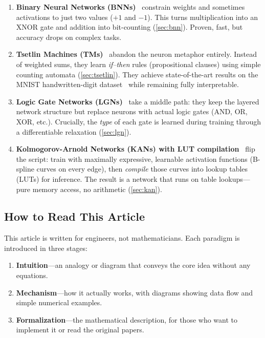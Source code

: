 \begin{enumerate}[leftmargin=2em]
  \item \textbf{Binary Neural Networks (BNNs)}~\cite{courbariaux2016bnn} constrain weights and
    sometimes activations to just two values ($+1$ and $-1$). This turns
    multiplication into an XNOR gate and addition into bit-counting
    (\cref{sec:bnn}).
    Proven, fast, but accuracy drops on complex tasks.

  \item \textbf{Tsetlin Machines (TMs)}~\cite{granmo2018tsetlin} abandon the neuron metaphor
    entirely. Instead of weighted sums, they learn \emph{if--then} rules
    (propositional clauses) using simple counting automata
    (\cref{sec:tsetlin}). They achieve
    state-of-the-art results on the MNIST handwritten-digit
    dataset~\cite{lecun1998mnist} while remaining fully
    interpretable.

  \item \textbf{Logic Gate Networks (LGNs)}~\cite{petersen2022difflogic} take a middle path: they
    keep the layered network structure but replace neurons with actual
    logic gates (AND, OR, XOR, etc.). Crucially, the \emph{type} of each
    gate is learned during training through a differentiable relaxation
    (\cref{sec:lgn}).

  \item \textbf{Kolmogorov-Arnold Networks (KANs) with LUT compilation}~\cite{liu2024kan}
    flip the script: train with maximally expressive, learnable
    activation functions (B-spline curves on every edge), then
    \emph{compile} those curves into lookup tables (LUTs) for inference.
    The result is a network that runs on table lookups---pure memory
    access, no arithmetic (\cref{sec:kan}).
\end{enumerate}

\subsection{How to Read This Article}

This article is written for engineers, not mathematicians. Each paradigm
is introduced in three stages:

\begin{enumerate}[leftmargin=2em]
  \item \textbf{Intuition}---an analogy or diagram that conveys the core
    idea without any equations.
  \item \textbf{Mechanism}---how it actually works, with diagrams showing
    data flow and simple numerical examples.
  \item \textbf{Formalization}---the mathematical description, for those
    who want to implement it or read the original papers.
\end{enumerate}

